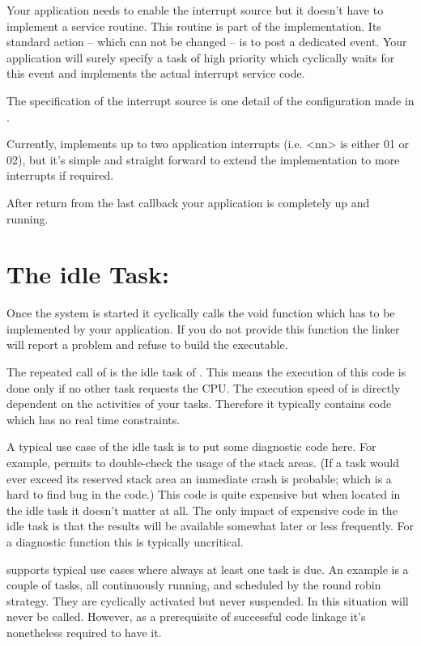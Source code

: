 Your application needs to enable the interrupt source but it doesn't have
to implement a service routine. This routine is part of the \rtos{}
implementation. Its standard action -- which can not be changed -- is to
post a dedicated event. Your application will surely specify a task of
high priority which cyclically waits for this event and implements the
actual interrupt service code.

The specification of the interrupt source is one detail of the \rtos{}
configuration made in .

Currently, \rtos{} implements up to two application interrupts (i.e.
\textless nn\textgreater{} is either 01 or 02), but it's simple and
straight forward to extend the implementation to more interrupts if
required.

After return from the last callback  your application is completely up and running.


\section{The idle Task: }

Once the system is started it cyclically calls the void function
 which has to be implemented by your application. If you do
not provide this function the linker will report a problem and refuse to
build the executable.

The repeated call of  is the idle task of \rtos{}. This means
the execution of this code is done only if no other task requests the
CPU. The execution speed of  is directly dependent on the
activities of your tasks. Therefore it typically contains code which has
no real time constraints.

A typical use case of the idle task is to put some diagnostic code here.
For example, \rtos{} permits to double-check the usage of the stack areas.
(If a task would ever exceed its reserved stack area an immediate crash is
probable; which is a hard to find bug in the code.) This code is quite
expensive but when located in the idle task it doesn't matter at all. The
only impact of expensive code in the idle task is that the results will be
available somewhat later or less frequently. For a diagnostic function
this is typically uncritical.

\rtos{} supports typical use cases where always at least one task is due.
An example is a couple of tasks, all continuously running, and scheduled
by the round robin strategy. They are cyclically activated but never
suspended. In this situation  will never be called. However,
as a prerequisite of successful code linkage it's nonetheless required to
have it.

